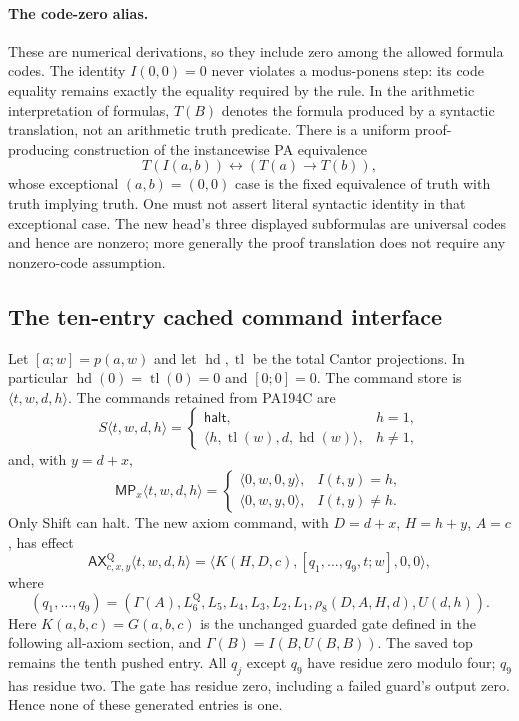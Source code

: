 \paragraph{The code-zero alias.}
These are numerical derivations, so they include zero among the allowed
formula codes. The identity $I(0,0)=0$ never violates a modus-ponens
step: its code equality remains exactly the equality required by the
rule. In the arithmetic interpretation of formulas, $T(B)$ denotes the
formula produced by a syntactic translation, not an arithmetic truth
predicate. There is a uniform proof-producing construction of the
instancewise PA equivalence
\[
 T(I(a,b))\leftrightarrow(T(a)\to T(b)),
\]
whose exceptional $(a,b)=(0,0)$ case is the fixed equivalence of truth
with truth implying truth. One must not assert literal syntactic
identity in that exceptional case. The new head's three displayed
subformulas are universal codes and hence are nonzero; more generally
the proof translation does not require any nonzero-code assumption.

\subsection{The ten-entry cached command interface}

Let $[a;w]=p(a,w)$ and let $\operatorname{hd},\operatorname{tl}$ be
the total Cantor projections. In particular
$\operatorname{hd}(0)=\operatorname{tl}(0)=0$ and $[0;0]=0$.
The command store is $\langle t,w,d,h\rangle$. The commands retained
from PA194C are
\[
 S\langle t,w,d,h\rangle=
 \begin{cases}
   \mathsf{halt},&h=1,\\
   \langle h,\operatorname{tl}(w),d,\operatorname{hd}(w)\rangle,
       &h\ne1,
 \end{cases}
\]
and, with $y=d+x$,
\[
 \mathsf{MP}_x\langle t,w,d,h\rangle=
 \begin{cases}
   \langle0,w,0,y\rangle,&I(t,y)=h,\\
   \langle0,w,y,0\rangle,&I(t,y)\ne h.
 \end{cases}
\tag{Q5}
\]
Only Shift can halt. The new axiom command, with
$D=d+x$, $H=h+y$, $A=c$, has effect
\[
 \mathsf{AX}^{\mathrm Q}_{c,x,y}\langle t,w,d,h\rangle
  =\langle K(H,D,c),[q_1,\ldots,q_9,t;w],0,0\rangle,
\]
where
\[
 (q_1,\ldots,q_9)=
 (\Gamma(A),L_6^{\mathrm Q},L_5,L_4,L_3,L_2,L_1,
      \rho_8(D,A,H,d),U(d,h)).
\tag{Q6}
\]
Here $K(a,b,c)=G(a,b,c)$ is the unchanged guarded gate defined in the
following all-axiom section, and
$\Gamma(B)=I(B,U(B,B))$. The saved top remains the tenth pushed
entry. All $q_j$ except $q_9$ have residue zero modulo four;
$q_9$ has residue two. The gate has residue zero, including a failed
guard's output zero. Hence none of these generated entries is one.


